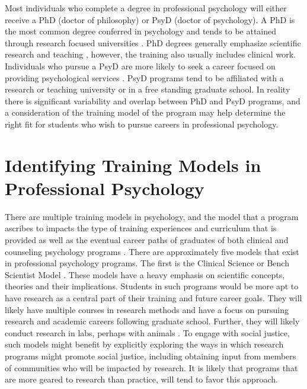 \documentclass[
  11pt,
]{book}
\begin{document}
Most individuals who complete a degree in professional psychology will either receive a PhD (doctor of philosophy) or PsyD (doctor of psychology). A PhD is the most common degree conferred in psychology and tends to be attained through research focused universities \citep{michalski_doctoral_nodate}. PhD degrees generally emphasize scientific research and teaching \citep{michalski_doctoral_nodate}, however, the training also usually includes clinical work. Individuals who pursue a PsyD are more likely to seek a career focused on providing psychological services \citep{michalski_doctoral_nodate}. PsyD programs tend to be affiliated with a research or teaching university or in a free standing graduate school. In reality there is significant variability and overlap between PhD and PsyD programs, and a consideration of the training model of the program may help determine the right fit for students who wish to pursue careers in professional psychology.

\section{Identifying Training Models in Professional Psychology}\label{identifying-training-models-in-professional-psychology}

There are multiple training models in psychology, and the model that a program ascribes to impacts the type of training experiences and curriculum that is provided as well as the eventual career paths of graduates of both clinical \citep{cherry_examination_2000} and counseling psychology programs \citep{neimeyer_does_2005}. There are approximately five models that exist in professional psychology programs. The first is the Clinical Science or Bench Scientist Model \citep{deangelis_three_2003, university_of_arizona_clinical_psychology_program_program_2023}. These models have a heavy emphasis on scientific concepts, theories and their implications. Students in such programs would be more apt to have research as a central part of their training and future career goals. They will likely have multiple courses in research methods and have a focus on pursuing research and academic careers following graduate school. Further, they will likely conduct research in labs, perhaps with animals \citep{deangelis_three_2003}. To engage with social justice, such models might benefit by explicitly exploring the ways in which research programs might promote social justice, including obtaining input from members of communities who will be impacted by research. It is likely that programs that are more geared to research than practice, will tend to favor this approach.
\end{document}
